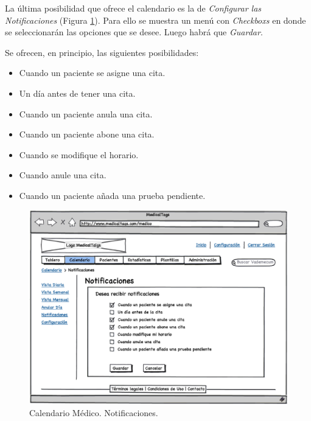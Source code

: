 			La última posibilidad que ofrece el calendario es la de \textit{Configurar las Notificaciones} (Figura \ref{fig:calendario_notificaciones}). Para ello se muestra un menú con \textit{Checkboxs} en donde se seleccionarán las opciones que se desee. Luego habrá que \textit{Guardar}. 
			
			Se ofrecen, en principio, las siguientes posibilidades:
			\begin{itemize}
				\item Cuando un paciente se asigne una cita.
				\item Un día antes de tener una cita.
				\item Cuando un paciente anula una cita.
				\item Cuando un paciente abone una cita.
				\item Cuando se modifique el horario.
				\item Cuando anule una cita.
				\item Cuando un paciente añada una prueba pendiente.
			\end{itemize}
			
			
			\begin{figure}[H]
			  \centering
			    \includegraphics[width=12cm]{img/eps/16_Calendario_Medico_Notificaciones.eps}
			  \caption{Calendario Médico. Notificaciones.}
			  \label{fig:calendario_notificaciones}
			\end{figure}
			
			
		
